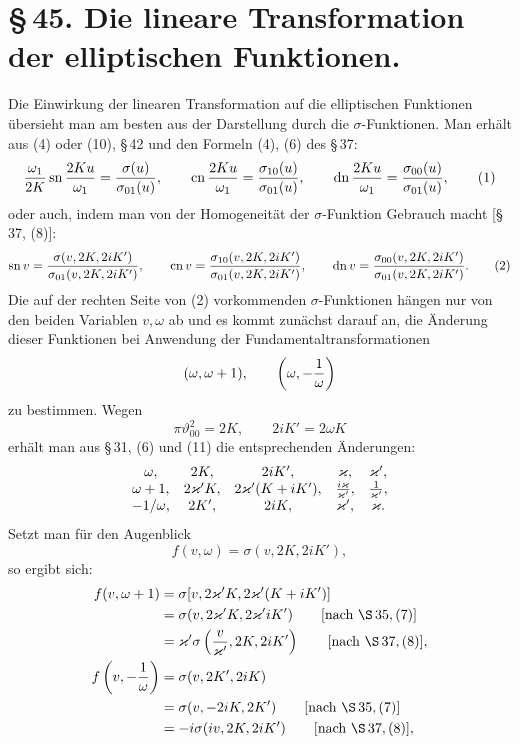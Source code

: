 \documentclass[11pt]{article}
\providecommand{\tht}{\vartheta}
\providecommand{\sn}{\operatorname{sn}}
\providecommand{\cn}{\operatorname{cn}}
\providecommand{\dn}{\operatorname{dn}}
\begin{document}
\section*{\S\,45. Die lineare Transformation der elliptischen Funktionen.}

Die Einwirkung der linearen Transformation auf die elliptischen Funktionen übersieht man am besten aus der Darstellung durch die $\sigma$-Funktionen. Man erhält aus (4) oder (10), \S\,42 und den Formeln (4), (6) des \S\,37:
\begin{equation}
{\omega_1\over2K}\sn{2Ku\over\omega_1}={\sigma(u)\over\sigma_{01}(u)},
\qquad
\cn{2Ku\over\omega_1}={\sigma_{10}(u)\over\sigma_{01}(u)},
\qquad
\dn{2Ku\over\omega_1}={\sigma_{00}(u)\over\sigma_{01}(u)},
\tag{1}
\end{equation}
oder auch, indem man von der Homogeneität der $\sigma$-Funktion Gebrauch macht [\S\,37, (8)]:
\begin{equation}
\sn v={\sigma(v,2K,2iK')\over\sigma_{01}(v,2K,2iK')},
\qquad
\cn v={\sigma_{10}(v,2K,2iK')\over\sigma_{01}(v,2K,2iK')},
\qquad
\dn v={\sigma_{00}(v,2K,2iK')\over\sigma_{01}(v,2K,2iK')}.
\tag{2}
\end{equation}
Die auf der rechten Seite von (2) vorkommenden $\sigma$-Funktionen hängen nur von den beiden Variablen $v,\omega$ ab und es kommt zunächst darauf an, die Änderung dieser Funktionen bei Anwendung der Fundamentaltransformationen
\[
(\omega,\omega+1),
\qquad
\left(\omega,-{1\over\omega}\right)
\]
zu bestimmen. Wegen
\[
\pi\tht_{00}^{2}=2K,
\qquad
2iK'=2\omega K
\]
erhält man aus \S\,31, (6) und (11) die entsprechenden Änderungen:
\[
\begin{array}{ccccc}
\omega,&2K,&2iK',&\varkappa,&\varkappa',\\
\omega+1,&2\varkappa'K,&2\varkappa'(K+iK'),&{i\varkappa\over\varkappa'},&{1\over\varkappa'},\\
-1/\omega,&2K',&2iK,&\varkappa',&\varkappa.
\end{array}
\]
Setzt man für den Augenblick
\[
f(v,\omega)=\sigma(v,2K,2iK'),
\]
so ergibt sich:
\begin{align*}
f(v,\omega+1)&=\sigma[v,2\varkappa'K,2\varkappa'(K+iK')]\\
&=\sigma(v,2\varkappa'K,2\varkappa'iK') \qquad [\text{nach }\S\,35,(7)]\\
&=\varkappa'\sigma\left({v\over\varkappa'},2K,2iK'\right) \qquad [\text{nach }\S\,37,(8)],\\
f\left(v,-{1\over\omega}\right)&=\sigma(v,2K',2iK)\\
&=\sigma(v,-2iK,2K') \qquad [\text{nach }\S\,35,(7)]\\
&=-i\sigma(iv,2K,2iK') \qquad [\text{nach }\S\,37,(8)],
\end{align*}
\end{document}
